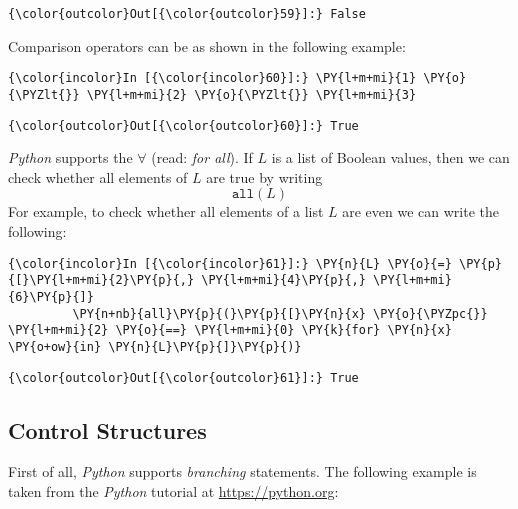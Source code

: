 \begin{Verbatim}[commandchars=\\\{\}]
{\color{outcolor}Out[{\color{outcolor}59}]:} False
\end{Verbatim}
Comparison operators can be  as shown in the following example:

\begin{Verbatim}[commandchars=\\\{\}]
{\color{incolor}In [{\color{incolor}60}]:} \PY{l+m+mi}{1} \PY{o}{\PYZlt{}} \PY{l+m+mi}{2} \PY{o}{\PYZlt{}} \PY{l+m+mi}{3}
\end{Verbatim}


\begin{Verbatim}[commandchars=\\\{\}]
{\color{outcolor}Out[{\color{outcolor}60}]:} True
\end{Verbatim}
            
\textsl{Python} supports the  \(\forall\) (read: \emph{for all}). If \(L\) is
a list of Boolean values, then we can check whether all elements of
\(L\) are true by writing \[ \texttt{all}(L) \] For example, to check
whether all elements of a list \(L\) are even we can write the
following:

\begin{Verbatim}[commandchars=\\\{\}]
{\color{incolor}In [{\color{incolor}61}]:} \PY{n}{L} \PY{o}{=} \PY{p}{[}\PY{l+m+mi}{2}\PY{p}{,} \PY{l+m+mi}{4}\PY{p}{,} \PY{l+m+mi}{6}\PY{p}{]}
         \PY{n+nb}{all}\PY{p}{(}\PY{p}{[}\PY{n}{x} \PY{o}{\PYZpc{}} \PY{l+m+mi}{2} \PY{o}{==} \PY{l+m+mi}{0} \PY{k}{for} \PY{n}{x} \PY{o+ow}{in} \PY{n}{L}\PY{p}{]}\PY{p}{)}
\end{Verbatim}


\begin{Verbatim}[commandchars=\\\{\}]
{\color{outcolor}Out[{\color{outcolor}61}]:} True
\end{Verbatim}
            
    \subsection{Control Structures}\label{control-structures}

    First of all, \textsl{Python} supports \emph{branching} statements. The following
example is taken from the \textsl{Python} tutorial at \href{https://python.org}{https://python.org}:

